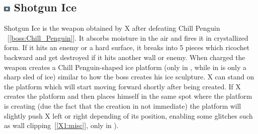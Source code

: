 \subsection{\includegraphics[width=12px, height=10px]{figures/X1/weapons/S_ice.jpg} Shotgun Ice}\label{Shotgun_ice}
Shotgun Ice is the weapon obtained by X after defeating Chill Penguin ~[\ref{boss:Chill_Penguin}]. It absorbs moisture in the air and fires it in crystallized form. If it hits an enemy or a hard surface, it breaks into 5 pieces which ricochet backward and get destroyed if it hits another wall or enemy. When charged the weapon creates a Chill Penguin-shaped ice platform (only in \x, while in \mhx is only a sharp sled of ice) similar to how the boss creates his ice sculpture. X can stand on the platform which will start moving forward shortly after being created. If X creates the platform and then places himself in the same spot where the platform is creating (due the fact that the creation in not immediate) the platform will slightly push X left or right depending of its position, enabling some glitches such as wall clipping~[\ref{X1:misc}], only in \x).
